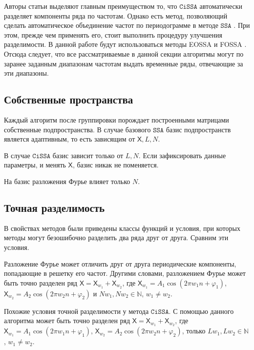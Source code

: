 \documentclass[12pt, specialist, subf
]{disser}
\theoremstyle{definition}
\newcommand{\SSA}{\texttt{SSA}}
\newcommand{\CISSA}{\texttt{CiSSA}}
\newcommand{\TS}{\mathsf{X}}
\begin{document}
\label{subsubsec:autogroup}

Авторы статьи \cite{bogalo2020} выделяют главным преимуществом то, что $\CISSA$ автоматически разделяет компоненты ряда по частотам. Однако есть метод, позволяющий сделать автоматическое объединение частот по периодограмме в методе $\SSA$
\cite{golyandina2023automatedidentificationsingularspectrum}
. При этом, прежде чем применять его, стоит выполнить процедуру улучшения разделимости. В данной работе будут использоваться методы EOSSA и FOSSA \cite{golyandina2023intelligent}. Отсюда следует, что все рассматриваемые в данной секции алгоритмы могут по заранее заданным диапазонам частотам выдать временные ряды, отвечающие за эти диапазоны.



\subsection{Собственные пространства}
Каждый алгоритм после группировки порождает построенными матрицами собственные подпространства. В случае базового $\SSA$ базис подпространств является адаптивным, то есть зависящим от $\TS, L, N$.

В случае $\CISSA$ базис зависит только от $L, N$. Если зафиксировать данные параметры, и менять $\TS$, базис никак не поменяется.

На базис разложения Фурье влияет только $N$.


\subsection{Точная разделимость}
\label{subsubsec:exact}

В свойствах методов были приведены классы функций и условия, при которых методы могут безошибочно разделить два ряда друг от друга. Сравним эти условия.

Разложение Фурье может отличить друг от друга периодические компоненты, попадающие в решетку его частот. Другими словами, разложением Фурье может быть точно разделен ряд $\TS = \TS_{w_1} + \TS_{w_2}$, где $\TS_{w_1} = A_1 \cos(2\pi w_1 n + \varphi_1)$, $\TS_{w_2} = A_2 \cos(2\pi w_2 n + \varphi_2)$ и $Nw_1, Nw_2 \in \mathbb{N}$, $w_1 \not = w_2$.

Похожие условия точной разделимости у метода $\CISSA$. С помощью данного алгоритма может быть точно разделен ряд $\TS = \TS_{w_1} + \TS_{w_2}$, где $\TS_{w_1} = A_1 \cos(2\pi w_1 n + \varphi_1)$, $\TS_{w_2} = A_2 \cos(2\pi w_2 n + \varphi_2)$, только $Lw_1, Lw_2 \in \mathbb{N}$, $w_1 \not = w_2$.
\end{document}
